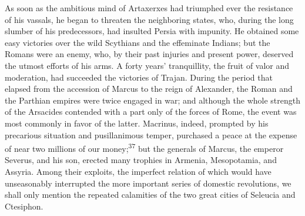 As soon as the ambitious mind of Artaxerxes had triumphed ever
the resistance of his vassals, he began to threaten the
neighboring states, who, during the long slumber of his
predecessors, had insulted Persia with impunity. He obtained some
easy victories over the wild Scythians and the effeminate
Indians; but the Romans were an enemy, who, by their past
injuries and present power, deserved the utmost efforts of his
arms. A forty years’ tranquillity, the fruit of valor and
moderation, had succeeded the victories of Trajan. During the
period that elapsed from the accession of Marcus to the reign of
Alexander, the Roman and the Parthian empires were twice engaged
in war; and although the whole strength of the Arsacides
contended with a part only of the forces of Rome, the event was
most commonly in favor of the latter. Macrinus, indeed, prompted
by his precarious situation and pusillanimous temper, purchased a
peace at the expense of near two millions of our money;\textsuperscript{37} but
the generals of Marcus, the emperor Severus, and his son, erected
many trophies in Armenia, Mesopotamia, and Assyria. Among their
exploits, the imperfect relation of which would have unseasonably
interrupted the more important series of domestic revolutions, we
shall only mention the repeated calamities of the two great
cities of Seleucia and Ctesiphon.


